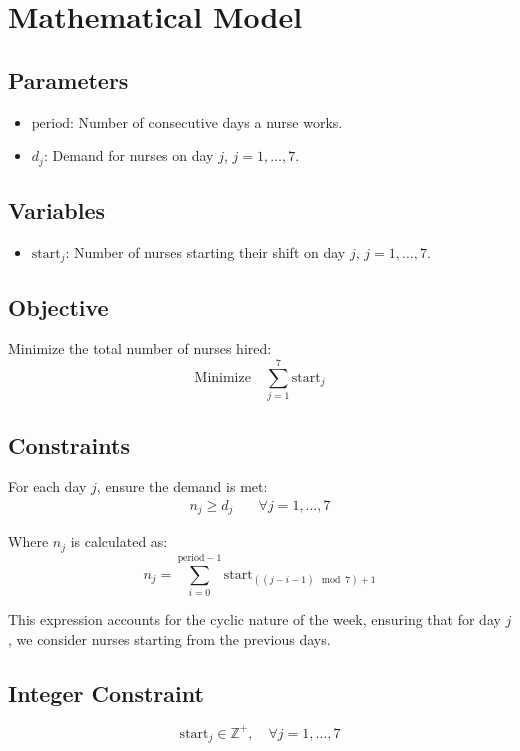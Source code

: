 \documentclass{article}
\begin{document}
\section*{Mathematical Model}

\subsection*{Parameters}
\begin{itemize}
    \item \( \text{period} \): Number of consecutive days a nurse works.
    \item \( d_j \): Demand for nurses on day \( j \), \( j = 1, \dots, 7 \).
\end{itemize}

\subsection*{Variables}
\begin{itemize}
    \item \( \text{start}_j \): Number of nurses starting their shift on day \( j \), \( j = 1, \dots, 7 \).
\end{itemize}

\subsection*{Objective}
Minimize the total number of nurses hired:
\[
\text{Minimize} \quad \sum_{j=1}^{7} \text{start}_j
\]

\subsection*{Constraints}
For each day \( j \), ensure the demand is met:
\[
\begin{aligned}
    n_j \geq d_j \quad & \forall j = 1, \dots, 7
\end{aligned}
\]

Where \( n_j \) is calculated as:
\[
n_j = \sum_{i=0}^{\text{period}-1} \text{start}_{((j-i-1) \mod 7) + 1}
\]

This expression accounts for the cyclic nature of the week, ensuring that for day \( j \), we consider nurses starting from the previous  days.

\subsection*{Integer Constraint}
\[
\text{start}_j \in \mathbb{Z}^+, \quad \forall j = 1, \dots, 7
\]
\end{document}
